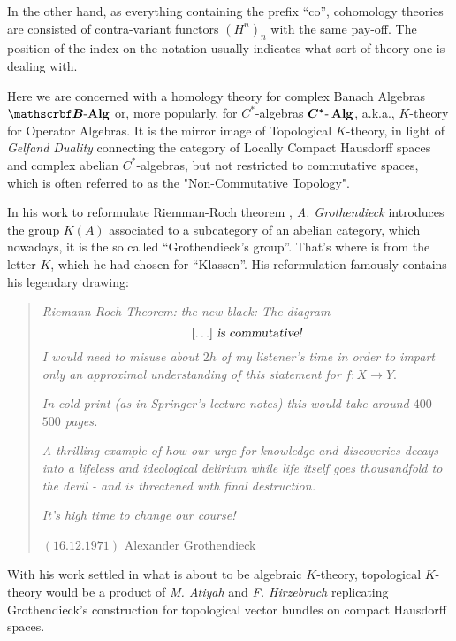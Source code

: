 In the other hand, as everything containing the prefix ``co'', cohomology theories are consisted of contra-variant functors $(H^n)_{n}$ with the same pay-off. The position of the index on the notation usually indicates what sort of theory one is dealing with. 

Here we are concerned with a homology theory for complex Banach Algebras $\BAlg$ or, more popularly, for $C^*$-algebras $\boldsymbol{C^*\text{-}\operatorname{Alg}}$, a.k.a., $K$-theory for Operator Algebras. It is the mirror image of Topological $K$-theory, in light of \textit{Gelfand Duality} connecting the category of Locally Compact Hausdorff spaces and complex abelian $C^*$-algebras, but not restricted to commutative spaces, 
which is often referred to as the "Non-Commutative Topology". 

In his work to reformulate Riemman-Roch theorem \cite{borel1958theoreme}, \textit{A. Grothendieck} introduces the group $K(A)$ associated to a subcategory of an abelian category, which nowadays, it is the so called ``Grothendieck's group''. That's where is from the letter $K$, which he had chosen for ``Klassen''. His reformulation famously contains his legendary drawing:
\begin{figure}[H]
	\centering
	
\end{figure}
\begin{quote}
	\textsl{Riemann-Roch Theorem: the new black: The diagram}
	$$[\ldots] \textsl{ is commutative!}$$
	\textsl{I would need to misuse about $2 h$ of my listener's time in order to impart only an approximal understanding of this statement for }$f:X \longrightarrow Y$.
	
	\textsl{In cold print (as in Springer's lecture notes) this would take around $400$-$500$ pages.}
	
	\textsl{A thrilling example of how our urge for knowledge and discoveries decays into a lifeless and ideological delirium while life itself goes thousandfold to the devil - and is threatened with final destruction.}
	
	\textsl{It's high time to change our course!}

	$(16.12 .1971)$ \hfill Alexander Grothendieck
\end{quote}
With his work settled in what is about to be algebraic $K$-theory, topological $K$-theory would be a product of \textit{M. Atiyah} and \textit{F. Hirzebruch} replicating Grothendieck's construction for topological vector bundles on compact Hausdorff spaces. 

